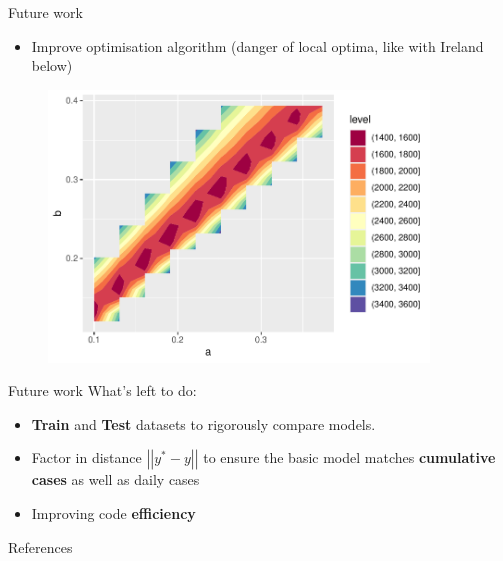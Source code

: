 \documentclass{beamer}
\begin{document}
\begin{frame}{Future work}
    \begin{itemize}
        \item Improve optimisation algorithm (danger of local optima, like with Ireland below)
    \end{itemize}
    \begin{figure}
\includegraphics[width=0.9\textwidth]{Plots/Ireland-zoomcontour.pdf}
\end{figure}
\end{frame}

\begin{frame}{Future work}
    What's left to do:
    \begin{itemize}
        \item \textbf{Train} and \textbf{Test} datasets to rigorously compare models.
        \item Factor in distance $\left|\left|y^*-y\right|\right|$ to ensure the basic model matches \textbf{cumulative cases} as well as daily cases
        \item Improving code \textbf{efficiency}
    \end{itemize}
\end{frame}

\begin{frame}{References}
    \printbibliography
\end{frame}
\end{document}
